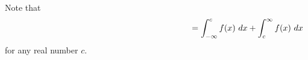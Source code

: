 \documentclass[12pt, a4paper]{article}
\begin{document}
\vspace{-2in}
\begin{thrm}
  Note that \vspace{0.5in} \[
    \hspace{3in} = \int_{-\infty}^c f(x) \dx + \int_c^\infty f(x) \dx
  \]
  for any real number \(c\).
\end{thrm}
\end{document}
